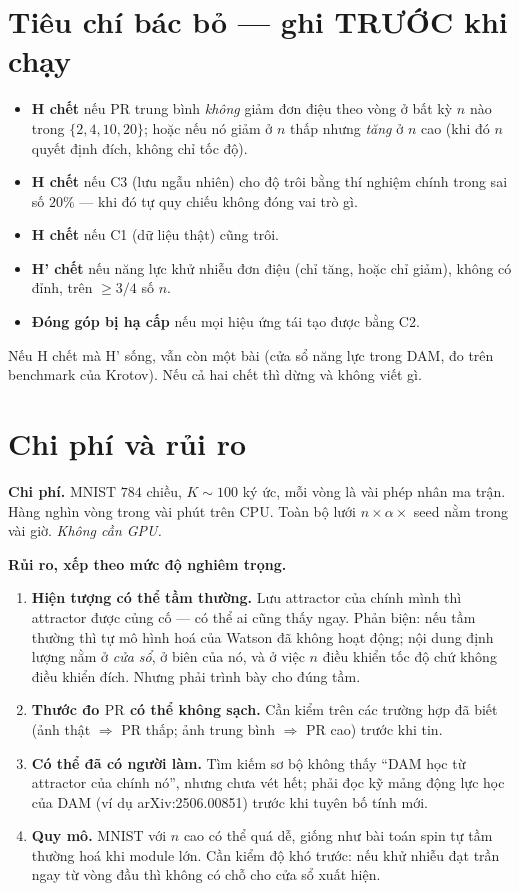 \documentclass[11pt,a4paper]{article}
\newcommand{\warn}[1]{\par\vspace{1.5mm}\noindent\colorbox{warnbg}{\parbox{0.965\textwidth}{\vspace{1.2mm}#1\vspace{1.2mm}}}\vspace{1.5mm}}
\begin{document}
\section{Tiêu chí bác bỏ --- ghi TRƯỚC khi chạy}

\warn{\begin{itemize}[nosep,leftmargin=6mm]
\item \textbf{H chết} nếu $\mathrm{PR}$ trung bình \emph{không} giảm đơn điệu
theo vòng ở bất kỳ $n$ nào trong $\{2,4,10,20\}$; hoặc nếu nó giảm ở $n$ thấp
nhưng \emph{tăng} ở $n$ cao (khi đó $n$ quyết định đích, không chỉ tốc độ).
\item \textbf{H chết} nếu C3 (lưu ngẫu nhiên) cho độ trôi bằng thí nghiệm chính
trong sai số $20\%$ --- khi đó tự quy chiếu không đóng vai trò gì.
\item \textbf{H chết} nếu C1 (dữ liệu thật) cũng trôi.
\item \textbf{H' chết} nếu năng lực khử nhiễu đơn điệu (chỉ tăng, hoặc chỉ
giảm), không có đỉnh, trên $\ge 3/4$ số $n$.
\item \textbf{Đóng góp bị hạ cấp} nếu mọi hiệu ứng tái tạo được bằng C2.
\end{itemize}
Nếu H chết mà H' sống, vẫn còn một bài (cửa sổ năng lực trong DAM, đo trên
benchmark của Krotov). Nếu cả hai chết thì dừng và không viết gì.}

\section{Chi phí và rủi ro}

\textbf{Chi phí.} MNIST $784$ chiều, $K\sim100$ ký ức, mỗi vòng là vài phép nhân
ma trận. Hàng nghìn vòng trong vài phút trên CPU. Toàn bộ lưới
$n\times\alpha\times$ seed nằm trong vài giờ. \emph{Không cần GPU.}

\textbf{Rủi ro, xếp theo mức độ nghiêm trọng.}
\begin{enumerate}[leftmargin=7mm,itemsep=1.5mm]
\item \textbf{Hiện tượng có thể tầm thường.} Lưu attractor của chính mình thì
attractor được củng cố --- có thể ai cũng thấy ngay. Phản biện: nếu tầm thường
thì tự mô hình hoá của Watson đã không hoạt động; nội dung định lượng nằm ở
\emph{cửa sổ}, ở biên của nó, và ở việc $n$ điều khiển tốc độ chứ không điều
khiển đích. Nhưng phải trình bày cho đúng tầm.
\item \textbf{Thước đo $\mathrm{PR}$ có thể không sạch.} Cần kiểm trên các
trường hợp đã biết (ảnh thật $\Rightarrow$ PR thấp; ảnh trung bình $\Rightarrow$
PR cao) trước khi tin.
\item \textbf{Có thể đã có người làm.} Tìm kiếm sơ bộ không thấy ``DAM học từ
attractor của chính nó'', nhưng chưa vét hết; phải đọc kỹ mảng động lực học của
DAM (ví dụ arXiv:2506.00851) trước khi tuyên bố tính mới.
\item \textbf{Quy mô.} MNIST với $n$ cao có thể quá dễ, giống như bài toán spin
tự tầm thường hoá khi module lớn. Cần kiểm độ khó trước: nếu khử nhiễu đạt trần
ngay từ vòng đầu thì không có chỗ cho cửa sổ xuất hiện.
\end{enumerate}
\end{document}
